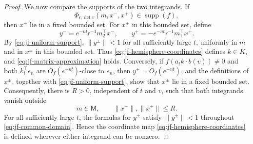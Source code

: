 \documentclass[reqno,11pt]{amsart}
\numberwithin{equation}{section}
\theoremstyle{definition}
\theoremstyle{remark}
\begin{document}
\begin{proof}
We now compare the supports of the two integrands. If
$$
\Phi_{\mathsf r,\det v}(m,x^-,x^+)
\in\operatorname{supp}(f),
$$
then $x^\pm$ lie in a fixed bounded set. For $x^\pm$ in this bounded
set, define
$$
y^-=e^{-nt}\mathsf r^{-1}m_2^{\intercal}x^-,
\qquad
y^+=-e^{-nt}\mathsf r^{-1}m_1^{\intercal}x^+.
$$
By \eqref{eq:jf-uniform-support}, $\|y^\pm\|<1$ for all sufficiently
large $t$, uniformly in $m$ and in $x^\pm$ in this bounded set. Thus
\eqref{eq:jf-hemisphere-coordinates} defines $k\in K$, and
\eqref{eq:jf-matrix-approximation} holds. Conversely, if
$f(a_tk\cdot b(v))\ne0$ and both $k_i^{\intercal}e_n$ are
$O_f(e^{-nt})$-close to $e_n$, then $y^\pm=O_f(e^{-nt})$, and the
definitions of $x^\pm$, together with \eqref{eq:jf-uniform-support},
show that $x^\pm$ lie in a fixed bounded set. Consequently, there is
$R>0$, independent of $t$ and $v$, such that both integrands vanish
outside
\begin{equation}\label{eq:jf-common-domain}
m\in\mathsf M,
\qquad
\|x^-\|,\|x^+\|\le R.
\end{equation}
For all sufficiently large $t$, the formulas for $y^\pm$ satisfy
$\|y^\pm\|<1$ throughout \eqref{eq:jf-common-domain}. Hence
the coordinate map \eqref{eq:jf-hemisphere-coordinates} is defined wherever either integrand can be nonzero.


\end{proof}
\end{document}
